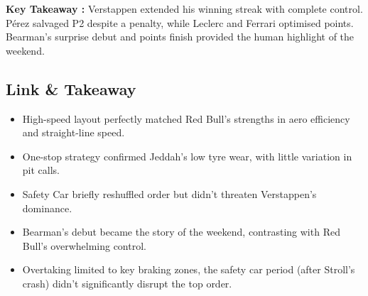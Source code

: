 \textbf{Key Takeaway :}
Verstappen extended his winning streak with complete control. Pérez salvaged P2 despite a penalty, while Leclerc and Ferrari optimised points. Bearman’s surprise debut and points finish provided the human highlight of the weekend.


\subsection{Link \& Takeaway}

\begin{itemize}
    \item High-speed layout perfectly matched Red Bull’s strengths in aero efficiency and straight-line speed. 
    \item One-stop strategy confirmed Jeddah’s low tyre wear, with little variation in pit calls. 
    \item Safety Car briefly reshuffled order but didn’t threaten Verstappen’s dominance. 
    \item Bearman’s debut became the story of the weekend, contrasting with Red Bull’s overwhelming control. 
    \item Overtaking limited to key braking zones, the safety car period (after Stroll's crash) didn’t significantly disrupt the top order.
\end{itemize}